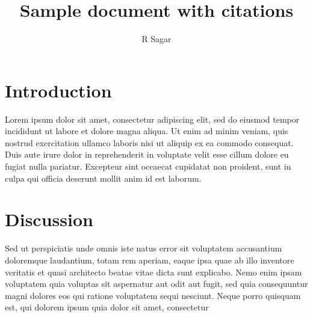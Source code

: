 \documentclass{article}
\begin{document}
\title{Sample document with citations}
\author{R Sagar}
\date{}
\maketitle
\section*{Introduction}
Lorem ipsum dolor sit amet,
consectetur adipiscing elit, sed do eiusmod
tempor incididunt ut labore et dolore magna
aliqua. Ut enim ad\cite{ipcc2018} minim veniam, quis nostrud
exercitation ullamco laboris nisi ut aliquip ex ea
commodo consequat. Duis aute irure dolor in reprehenderit
in voluptate velit esse cillum dolore eu fugiat nulla pariatur.
Excepteur sint occaecat cupidatat non proident, sunt in culpa qui
officia deserunt mollit anim id est laborum.
\cite{noaa2020,parmesan2006}
\section*{Discussion}
Sed ut perspiciatis unde omnis \cite{adger2005}iste natus error
 sit voluptatem accusantium doloremque laudantium, 
 totam rem aperiam, eaque ipsa quae ab illo inventore 
 veritatis et quasi\cite{islam2017} architecto beatae vitae dicta sunt 
 explicabo. Nemo enim ipsam voluptatem quia voluptas sit 
 aspernatur aut odit aut fugit, sed quia consequuntur magni 
 dolores eos qui ratione voluptatem sequi nesciunt. Neque porro 
 quisquam est, qui dolorem ipsum quia dolor sit amet, consectetur
 \cite{moser2007}


\end{document}
